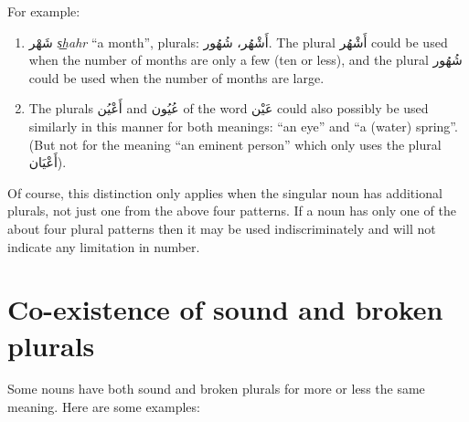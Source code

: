 \documentclass[
  10pt,
]{book}
\providecommand{\tightlist}{%
  \setlength{\itemsep}{0pt}\setlength{\parskip}{0pt}}
\begin{document}
\begin{enumerate}
  For example:

  \begin{enumerate}
  \def\labelenumii{\roman{enumii}.}
  \tightlist
  \item
    \foreignlanguage{arabic}{شَهْر} \emph{s͟hahr} \enquote{a month}, plurals: \foreignlanguage{arabic}{أَشْهُر، شُهُور}. The plural \foreignlanguage{arabic}{أَشْهُر} could be used when the number of months are only a few (ten or less), and the plural \foreignlanguage{arabic}{شُهُور} could be used when the number of months are large.
  \item
    The plurals \foreignlanguage{arabic}{أَعْيُن} and \foreignlanguage{arabic}{عُيُون} of the word \foreignlanguage{arabic}{عَيْن} could also possibly be used similarly in this manner for both meanings: \enquote{an eye} and \enquote{a (water) spring}. (But not for the meaning \enquote{an eminent person} which only uses the plural \foreignlanguage{arabic}{أَعْيَان}).
  \end{enumerate}

  Of course, this distinction only applies when the singular noun has additional plurals, not just one from the above four patterns. If a noun has only one of the about four plural patterns then it may be used indiscriminately and will not indicate any limitation in number.
\end{enumerate}

\section{Co-existence of sound and broken plurals}\label{co-existence-of-sound-and-broken-plurals}

Some nouns have both sound and broken plurals for more or less the same meaning. Here are some examples:
\end{document}
